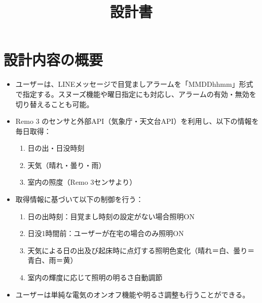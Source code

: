 \documentclass{jarticle}
\title{設計書}
\begin{document}
\maketitle

\section*{設計内容の概要}
\begin{itemize}
    \item ユーザーは、LINEメッセージで目覚ましアラームを「MMDDhhmm」形式で指定する。スヌーズ機能や曜日指定にも対応し、アラームの有効・無効を切り替えることも可能。\\
    \item Remo 3 のセンサと外部API（気象庁・天文台API）を利用し、以下の情報を毎日取得：\\
        \begin{enumerate}
            \item 日の出・日没時刻\\
            \item 天気（晴れ・曇り・雨）\\
            \item 室内の照度（Remo 3センサより）\\
        \end{enumerate}
    \item 取得情報に基づいて以下の制御を行う：\\
        \begin{enumerate}
            \item 日の出時刻：目覚まし時刻の設定がない場合照明ON\\
            \item 日没1時間前：ユーザーが在宅の場合のみ照明ON\\
            \item 天気による日の出及び起床時に点灯する照明色変化（晴れ＝白、曇り＝青白、雨＝黄）\\
            \item 室内の輝度に応じて照明の明るさ自動調節\\
        \end{enumerate}
    \item ユーザーは単純な電気のオンオフ機能や明るさ調整も行うことができる。
\end{itemize}
\end{document}
